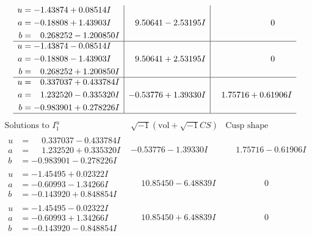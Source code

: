 \documentclass[1p]{elsarticle_modified}
\theoremstyle{definition}
\newcommand{\I}{\sqrt{-1}}
\begin{document}
$$\begin{array}{c|c|c}
\begin{aligned}
u &= -1.43874 + 0.08514 I \\
a &= -0.18808 + 1.43903 I \\
b &= \phantom{-}0.268252 - 1.200850 I\end{aligned}
 & \phantom{-}9.50641 - 2.53195 I & \phantom{-0.000000 } 0 \\ \hline\begin{aligned}
u &= -1.43874 - 0.08514 I \\
a &= -0.18808 - 1.43903 I \\
b &= \phantom{-}0.268252 + 1.200850 I\end{aligned}
 & \phantom{-}9.50641 + 2.53195 I & \phantom{-0.000000 } 0 \\ \hline\begin{aligned}
u &= \phantom{-}0.337037 + 0.433784 I \\
a &= \phantom{-}1.232520 - 0.335320 I \\
b &= -0.983901 + 0.278226 I\end{aligned}
 & -0.53776 + 1.39330 I & \phantom{-}1.75716 + 0.61906 I\\
 \hline 
 \end{array}$$\newpage$$\begin{array}{c|c|c}  
\text{Solutions to }I^u_{1}& \I (\text{vol} + \sqrt{-1}CS) & \text{Cusp shape}\\
 \hline 
\begin{aligned}
u &= \phantom{-}0.337037 - 0.433784 I \\
a &= \phantom{-}1.232520 + 0.335320 I \\
b &= -0.983901 - 0.278226 I\end{aligned}
 & -0.53776 - 1.39330 I & \phantom{-}1.75716 - 0.61906 I \\ \hline\begin{aligned}
u &= -1.45495 + 0.02322 I \\
a &= -0.60993 - 1.34266 I \\
b &= -0.143920 + 0.848854 I\end{aligned}
 & \phantom{-}10.85450 - 6.48839 I & \phantom{-0.000000 } 0 \\ \hline\begin{aligned}
u &= -1.45495 - 0.02322 I \\
a &= -0.60993 + 1.34266 I \\
b &= -0.143920 - 0.848854 I\end{aligned}
 & \phantom{-}10.85450 + 6.48839 I & \phantom{-0.000000 } 0 \\ \hline\begin{aligned}

\end{aligned}
\end{array}$$
\end{document}
